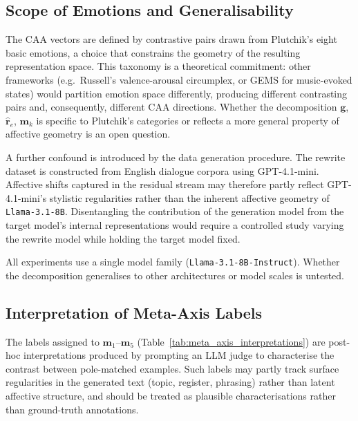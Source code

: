 \subsection{Scope of Emotions and Generalisability}

The CAA vectors are defined by contrastive pairs drawn from Plutchik's eight basic emotions, a choice that constrains the geometry of the resulting representation space. This taxonomy is a theoretical commitment: other frameworks (e.g.\ Russell's valence-arousal circumplex, or GEMS for music-evoked states) would partition emotion space differently, producing different contrasting pairs and, consequently, different CAA directions. Whether the decomposition $\mathbf{g}$, $\hat{\mathbf{r}}_e$, $\mathbf{m}_k$ is specific to Plutchik's categories or reflects a more general property of affective geometry is an open question.\par

A further confound is introduced by the data generation procedure. The rewrite dataset is constructed from English dialogue corpora using GPT-4.1-mini. Affective shifts captured in the residual stream may therefore partly reflect GPT-4.1-mini's stylistic regularities rather than the inherent affective geometry of \texttt{Llama-3.1-8B}. Disentangling the contribution of the generation model from the target model's internal representations would require a controlled study varying the rewrite model while holding the target model fixed.\par

All experiments use a single model family (\texttt{Llama-3.1-8B-Instruct}). Whether the decomposition generalises to other architectures or model scales is untested.\par

\subsection{Interpretation of Meta-Axis Labels}

The labels assigned to $\mathbf{m}_1$--$\mathbf{m}_5$ (Table~\ref{tab:meta_axis_interpretations}) are post-hoc interpretations produced by prompting an LLM judge to characterise the contrast between pole-matched examples. Such labels may partly track surface regularities in the generated text (topic, register, phrasing) rather than latent affective structure, and should be treated as plausible characterisations rather than ground-truth annotations.\par

